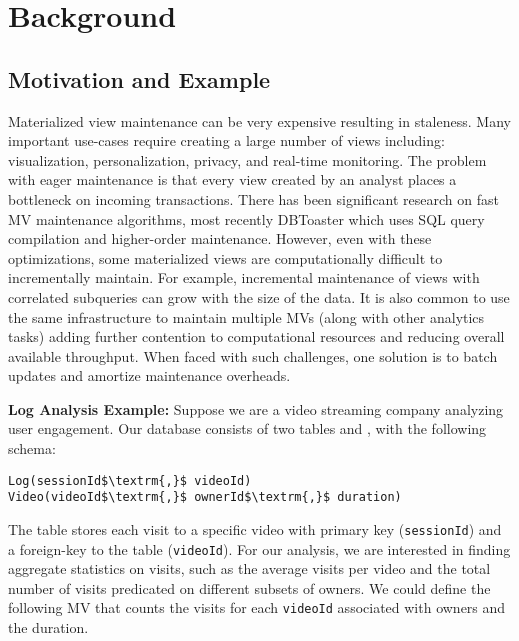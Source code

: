 \section{Background}\label{sec-background}

\subsection{Motivation and Example}\label{subsec-inc}
Materialized view maintenance can be very expensive resulting in staleness. 
Many important use-cases require creating a large number of views including: visualization, personalization, privacy, and real-time monitoring.  
The problem with eager maintenance is that every view created by an analyst places a bottleneck on incoming transactions.
There has been significant research on fast MV maintenance algorithms, most recently DBToaster \cite{DBLP:journals/vldb/KochAKNNLS14} which uses SQL query compilation and higher-order maintenance.
However, even with these optimizations, some materialized views are computationally difficult to incrementally maintain.
For example, incremental maintenance of views with correlated subqueries can grow with the size of the data.
It is also common to use the same infrastructure to maintain multiple MVs (along with other analytics tasks) adding further contention to computational resources and reducing overall available throughput. 
When faced with such challenges, one solution is to batch updates and amortize maintenance overheads.

\noindent \textbf{Log Analysis Example: } 
Suppose we are a video streaming company analyzing user engagement.
Our database consists of two tables  and , with the following schema:
\begin{lstlisting}[mathescape,basicstyle={\scriptsize}]
Log(sessionId$\textrm{,}$ videoId)
Video(videoId$\textrm{,}$ ownerId$\textrm{,}$ duration)
\end{lstlisting}
The  table stores each visit to a specific video with primary key (\texttt{sessionId}) and a foreign-key to the  table (\texttt{videoId}).
For our analysis, we are interested in finding aggregate statistics on visits, such as the average visits per video and the total number of visits predicated on different subsets of owners. 
We could define the following MV that counts the visits for each \texttt{videoId} associated with owners and the duration.


